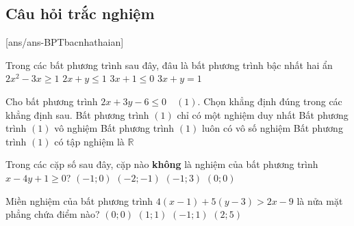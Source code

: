 \subsection{Câu hỏi trắc nghiệm}
[ans/ans-BPTbacnhathaian]
\begin{ex}%
	Trong các bất phương trình sau đây, đâu là bất phương trình bậc nhất hai ẩn
	\choice
	{$2x^2-3x \geq 1$}
	{\True $2x+y\leq 1$}
	{$3x+1\leq 0$}
	{$3x+y=1$}
\end{ex}
\begin{ex}%
	Cho bất phương trình $2x+3y-6 \leq 0\quad (1)$. Chọn khẳng định đúng trong các khẳng định sau.
	\choice
	{Bất phương trình $(1)$ chỉ có một nghiệm duy nhất}
	{Bất phương trình $(1)$ vô nghiệm}
	{\True Bất phương trình $(1)$ luôn có vô số nghiệm}
	{Bất phương trình $(1)$ có tập nghiệm là $\mathbb{R}$}
\end{ex}
\begin{ex}%
	Trong các cặp số sau đây, cặp nào \textbf{không} là nghiệm của bất phương trình $x-4y+1 \geq 0$?
	\choice
	{$(-1;0)$}
	{$(-2;-1)$}
	{\True $(-1;3)$}
	{$(0;0)$}
\end{ex}
\begin{ex}%
	Miền nghiệm của bất phương trình $4(x-1)+5(y-3)>2x-9$ là nửa mặt phẳng chứa điểm nào?
	\choice
	{$(0;0)$}
	{$(1;1)$}
	{$(-1;1)$}
	{\True $(2;5)$}
\end{ex}
